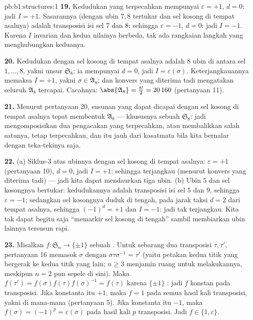 \begin{solution}{pb:b1:structures:1}
\textbf{19.} Kedudukan yang terpecahkan mempunyai $\varepsilon = +1$, $d = 0$:
jadi $I = +1$. Sasarannya (dengan ubin $7, 8$ tertukar dan sel kosong di tempat asalnya) adalah
transposisi isi sel $7$ dan $8$: sehingga $\varepsilon
= -1$, $d = 0$: jadi $I = -1$. Karena $I$ invarian dan kedua
nilainya berbeda, tak ada rangkaian langkah yang menghubungkan keduanya.

\textbf{20.} Kedudukan dengan sel kosong di tempat asalnya adalah 
$8$ ubin di antara sel $1, \dots, 8$, yakni unsur
$\mathfrak S_8$; ia mempunyai $d = 0$, jadi $I = \varepsilon(\sigma)$.
Keterjangkauannya memaksa $I = +1$, yakni $\sigma \in \mathfrak A_8$; dan
konvers yang diterima tadi mengatakan seluruh $\mathfrak A_8$ tercapai. Cacahnya:
$\abs{\mathfrak A_8} = \frac{8!}2 = 20\,160$ (pertanyaan 11).

\textbf{21.} Menurut pertanyaan 20, susunan yang dapat dicapai dengan sel
kosong di tempat asalnya tepat membentuk $\mathfrak A_8$ --- khususnya sebuah
\emph{} $\mathfrak S_8$: jadi mengomposisikan dua pengacakan yang
terpecahkan, atau membalikkan salah satunya, tetap terpecahkan, dan itu jauh dari
kasatmata bila kita bernalar dengan teka-tekinya saja.

\textbf{22.} (a) Siklus-$3$ atas ubinnya dengan sel kosong di tempat asalnya:
$\varepsilon = +1$ (pertanyaan 10), $d = 0$, jadi $I = +1$: sehingga terjangkau
(menurut konvers yang diterima tadi) --- jadi kita dapat mendaurkan tiga ubin.
(b) Ubin $5$ dan sel kosongnya bertukar: kedudukannya adalah
transposisi isi sel $5$ dan $9$, sehingga
$\varepsilon = -1$; sedangkan sel kosongnya duduk di tengah, pada jarak taksi
$d = 2$ dari tempat asalnya, sehingga $(-1)^d = +1$ dan $I = -1$:
jadi tak terjangkau. Kita tak dapat begitu saja ``memarkir sel kosong di tengah''
sambil membiarkan ubin lainnya tersusun rapi.

\textbf{23.} Misalkan $f \colon \mathfrak S_n \to \{\pm1\}$ sebuah
. Untuk sebarang dua transposisi $\tau, \tau'$, pertanyaan 16
memasok $\sigma$ dengan $\sigma\tau\sigma^{-1} = \tau'$ (yaitu petakan
kedua titik yang bergerak ke kedua titik yang lain; $n \geq 3$ menjamin ruang
untuk melakukannya, meskipun $n = 2$ pun sepele di sini). Maka $f(\tau') =
f(\sigma)f(\tau)f(\sigma)^{-1} = f(\tau)$ karena $\{\pm1\}$
: jadi $f$ konstan pada transposisi. Jika konstanta itu
$+1$, maka $f = 1$ pada semua hasil kali transposisi, yakni
di mana-mana (pertanyaan 5). Jika konstanta itu $-1$, maka $f(\sigma) =
(-1)^p = \varepsilon(\sigma)$ pada hasil kali $p$ transposisi.
Jadi $f \in \{1, \varepsilon\}$.


\end{solution}
